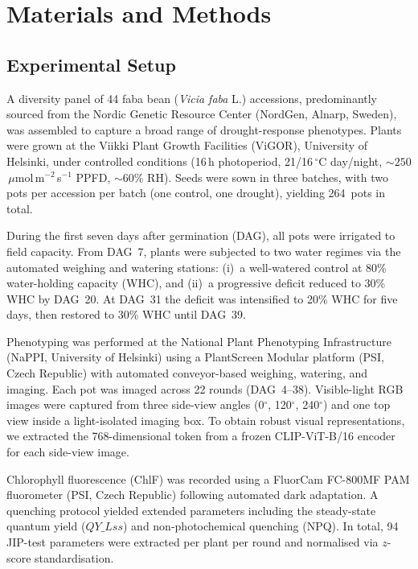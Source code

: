 \documentclass[a4paper,fleqn]{cas-dc}
\begin{document}
\section{Materials and Methods}\label{sec:methods}

\subsection{Experimental Setup}\label{sec:methods:experiment}

A diversity panel of 44 faba bean (\textit{Vicia faba} L.) accessions, predominantly sourced from the Nordic Genetic Resource Center (NordGen, Alnarp, Sweden), was assembled to capture a broad range of drought-response phenotypes. Plants were grown at the Viikki Plant Growth Facilities (ViGOR), University of Helsinki, under controlled conditions (16\,h photoperiod, 21/16\,$^\circ$C day/night, ${\sim}250$\,$\mu$mol\,m$^{-2}$\,s$^{-1}$ PPFD, ${\sim}60$\% RH). Seeds were sown in three batches, with two pots per accession per batch (one control, one drought), yielding 264~pots in total.

During the first seven days after germination (DAG), all pots were irrigated to field capacity. From DAG~7, plants were subjected to two water regimes via the automated weighing and watering stations: (i)~a well-watered control at 80\% water-holding capacity (WHC), and (ii)~a progressive deficit reduced to 30\% WHC by DAG~20. At DAG~31 the deficit was intensified to 20\% WHC for five days, then restored to 30\% WHC until DAG~39.

Phenotyping was performed at the National Plant Phenotyping Infrastructure (NaPPI, University of Helsinki) using a PlantScreen\texttrademark{} Modular platform (PSI, Czech Republic) with automated conveyor-based weighing, watering, and imaging. Each pot was imaged across 22 rounds (DAG~4--38). Visible-light RGB images were captured from three side-view angles (0$^\circ$, 120$^\circ$, 240$^\circ$) and one top view inside a light-isolated imaging box. To obtain robust visual representations, we extracted the 768-dimensional token from a frozen CLIP-ViT-B/16 encoder \citep{radfordLearningTransferableVisual2021} for each side-view image.

Chlorophyll fluorescence (ChlF) was recorded using a FluorCam FC-800MF PAM fluorometer (PSI, Czech Republic) following automated dark adaptation. A quenching protocol yielded extended parameters including the steady-state quantum yield ($QY\_Lss$) and non-photochemical quenching (NPQ). In total, 94 JIP-test parameters were extracted per plant per round and normalised via $z$-score standardisation.
\end{document}
